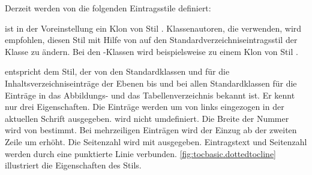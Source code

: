 Derzeit werden von  die folgenden Eintragsstile definiert:
\begin{description}
\item[\PValue{default}] ist in der Voreinstellung ein Klon von Stil
  . Klassenautoren, die  verwenden,
  wird empfohlen, diesen Stil mit Hilfe von
   auf den
  Standardverzeichniseintragsstil der Klasse zu ändern. Bei den
  \KOMAScript-Klassen wird  beispielsweise zu einem Klon von
  Stil .
\item[\PValue{dottedtocline}] entspricht dem Stil, der von den Standardklassen
   und  für die Inhaltsverzeichniseinträge der
  Ebenen  bis  und bei allen
  Standardklassen für die Einträge in das Abbildungs- und das
  Tabellenverzeichnis bekannt ist. Er kennt nur drei Eigenschaften. Die Einträge werden
  um  von links eingezogen in der aktuellen Schrift
  ausgegeben.  wird nicht umdefiniert. Die
  Breite der Nummer wird von  bestimmt. Bei mehrzeiligen
  Einträgen wird der Einzug ab der zweiten Zeile um 
  erhöht. Die Seitenzahl wird mit  ausgegeben. Eintragstext
  und Seitenzahl werden durch eine punktierte Linie
  verbunden. \autoref{fig:tocbasic.dottedtocline} illustriert die
  Eigenschaften des Stils.
  \begin{figure}
    \centering
\end{figure}
\end{description}
